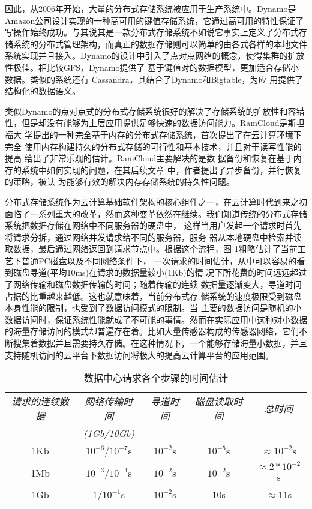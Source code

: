 因此，从2006年开始，大量的分布式存储系统被应用于生产系统中。Dynamo\cite{decandia2007dynamo}是Amazon公司设计实现的一种高可用的键值存储系统，它通过高可用的特性保证了写操作始终成功。与其说其是一款分布式存储系统不如说它事实上定义了分布式存储系统的分布式管理架构，而真正的数据存储则可以简单的由各式各样的本地文件系统实现并且接入。Dynamo的设计中引入了点对点网络的概念，使得集群的扩放性极佳。相比较GFS，Dynamo提供了
基于键值对的数据模型，更加适合存储小数据。类似的系统还有
Cassandra\cite{lakshman2010cassandra}，其结合了Dynamo和Bigtable，为应
用提供了结构化的数据语义。

类似Dynamo的点对点式的分布式存储系统很好的解决了存储系统的扩放性和容错性，但是却没有能够为上层应用提供足够快速的数据访问能力。RamCloud\cite{ousterhout2010case}是斯坦福大
学提出的一种完全基于内存的分布式存储系统，首次提出了在云计算环境下完全
使用内存构建持久的分布式存储的可行性和基本技术，并且对于读写性能的提高
给出了非常乐观的估计。RamCloud主要解决的是数
据备份和恢复在基于内存的系统中如何实现的问题，在其后续文章
\cite{ongaro2011fast}中，作者提出了异步备份，并行恢复的策略，被认
为能够有效的解决内存存储系统的持久性问题。

分布式存储系统作为云计算基础软件架构的核心组件之一，在云计算时代到来之初面临了一系列重大的改革，然而这种变革依然在继续。我们知道传统的分布式存储系统把数据存储在网络中不同服务器的硬盘中，
这样当用户发起一个请求时首先将请求分拆，通过网络并发请求给不同的服务器，服务
器从本地硬盘中检索并读取数据，最后通过网络返回到请求节点中。根据这个流程，图
\ref{table:queryspeed}粗略估计了当前工艺下普通PC磁盘以及不同网络条件下，
一次请求的时间估计，从中可以容易的看到磁盘寻道(平均10ms)在请求的数据量较小(1Kb)的情
况下所花费的时间远远超过了网络传输和磁盘数据传输的时间；随着传输的连续
数据量逐渐变大，寻道时间占据的比重越来越低。这也就意味着，当前分布式存
储系统的速度极限受到磁盘本身性能的限制，也受到了数据访问模式的限制。当
主要的数据访问是随机的小数据访问时，保证系统性能就成了不可能的事情。然而在实际应用中这种对小数据的海量存储访问的模式却普遍存在着。比如大量传感器构成的传感器网络，它们不断搜集着数据并且需要持久存储。在这种情况下，一个能够存储海量小数据，并且支持随机访问的云平台下数据访问将极大的提高云计算平台的应用范围。

\begin{table}[h!]\small
  \caption{数据中心请求各个步骤的时间估计}
  \label{table:queryspeed}
  \centering
  \begin{tabular}{|c|c|c|c|c|}
    \hline
    \textit{请求的连续数据} & \textit{网络传输时间} & \textit{寻道时间}
    & \textit{磁盘读取时间} & \textit{总时间} \\
    & \textit{(1Gb/10Gb)} & & &\\
    \hline
    1Kb & $10^{-6}$/$10^{-7}$s & $10^{-2}$s & $10^{-5}$s & $\approx 10^{-2}$s\\
    \hline
    1Mb & $10^{-3}$/$10^{-4}$s & $10^{-2}$s & $10^{-2}$s & $\approx 2*10^{-2}$s\\
    \hline
    1Gb & $1$/$10^{-1}$s & $10^{-2}$s & $10$s & $\approx 11$s\\
    \hline
  \end{tabular}
\end{table}

